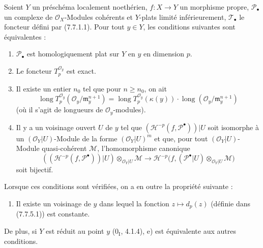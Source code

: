 \begin{proposition}[7.8.4]
Soient $Y$ un préschéma localement noethérien, $f:X\to Y$ un morphisme propre,
$\mathscr P_\bullet$ un complexe de $\mathscr O_X$-Modules cohérents et $Y$-plats
limité inférieurement, $\mathscr T_\bullet$ le foncteur défini par (7.7.1.1).
Pour tout $y\in Y$, les conditions suivantes sont équivalentes :
\begin{enumerate}
  \item[a)] $\mathscr P_\bullet$ est homologiquement plat sur $Y$ en $y$ en
    dimension $p$.
  \item[b)] Le foncteur $T_p^{\mathscr O_y}$ est exact.
  \item[c)] Il existe un entier $n_0$ tel que pour $n\geq n_0$, on ait
    \[
      \operatorname{long}T_p^{\mathscr O_y}
        (\mathscr O_y/\mathfrak m_y^{n+1})
      =
      \operatorname{long}T_p^{\mathscr O_y}(\kappa(y))
      \cdot
      \operatorname{long}(\mathscr O_y/\mathfrak m_y^{n+1})
      \tag{7.8.4.1}\label{III.7.8.4.1.fr}
    \]
    (où il s'agit de longueurs de $\mathscr O_y$-modules).
  \item[d)] Il y a un voisinage ouvert $U$ de $y$ tel que
    $(\mathscr H^{-p}(f,\mathscr P^\bullet))|U$ soit isomorphe à un
    $(\mathscr O_Y|U)$-Module de la forme $(\mathscr O_Y|U)^m$ et que, pour tout
    $(\mathscr O_Y|U)$-Module quasi-cohérent $\mathscr M$, l'homomorphisme
    canonique
    \[
      ((\mathscr H^{-p}(f,\mathscr P^\bullet))|U)
      \otimes_{\mathscr O_Y|U}\mathscr M
      \longrightarrow
      \mathscr H^{-p}
      \bigl(
        f,(\mathscr P^\bullet|U)
          \otimes_{\mathscr O_Y|U}\mathscr M
      \bigr)
      \tag{7.8.4.2}\label{III.7.8.4.2.fr}
    \]
    soit bijectif.
\end{enumerate}
Lorsque ces conditions sont vérifiées, on a en outre la propriété suivante :
\begin{enumerate}
  \item[e)] Il existe un voisinage de $y$ dans lequel la fonction
    $z\mapsto d_p(z)$ (définie dans (7.7.5.1)) est constante.
\end{enumerate}
De plus, si $Y$ est réduit au point $y$ ($0_{\mathrm I}$, 4.1.4), e) est
équivalente aux autres conditions.
\end{proposition}

